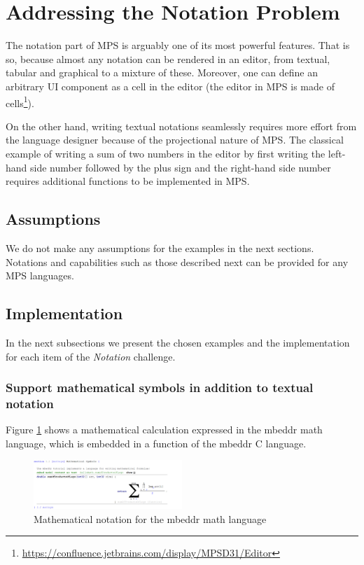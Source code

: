 \documentclass[preprint,numbers,10pt]{sigplanconf}
\begin{document}
%
%

\section{Addressing the Notation Problem}
The notation part of MPS is arguably one of its most powerful features.
That is so, because almost any notation can be rendered in an editor, from textual,
tabular and graphical to a mixture of these. Moreover, one can
define an arbitrary UI component as a cell in the editor (the editor in MPS is made
of cells\footnote{\url{https://confluence.jetbrains.com/display/MPSD31/Editor}}).

On the other hand, writing textual notations seamlessly requires more effort
from the language designer because of the projectional nature of MPS.
The classical example of writing a sum of two numbers in the editor by first writing the left-hand side
number followed by the plus sign and the right-hand side number requires additional
functions to be implemented in MPS.

\subsection{Assumptions}
We do not make any assumptions for the examples in the next sections. Notations and capabilities such as those
described next can be provided for any MPS languages.

\subsection{Implementation}
In the next subsections we present the chosen examples and the implementation for each
item of the \emph{Notation} challenge.

\subsubsection{Support mathematical symbols in addition to textual notation}
Figure \ref{fig:mathnotation} shows a mathematical calculation expressed in the mbeddr math language, which is embedded in a function of the mbeddr C language.
\begin{figure}[H]
	\centering
	\includegraphics[width=0.50\textwidth]{screens/MathematicalNotation.png}
	\caption{Mathematical notation for the mbeddr math language}
	\label{fig:mathnotation}
\end{figure}
\end{document}
